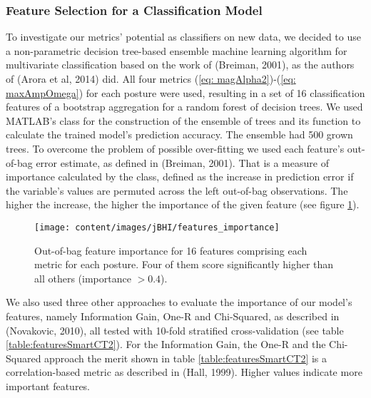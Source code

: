 \subsubsection{Feature Selection for a Classification Model}
\label{subsubsec:SmartCT2Features}
To investigate our metrics' potential as classifiers on new data, we decided to use a non-parametric decision tree-based ensemble machine learning algorithm for multivariate classification based on the work of (Breiman, 2001), as the authors of (Arora et al, 2014) did. All four metrics (\ref{eq: magAlpha2})-(\ref{eq: maxAmpOmega}) for each posture were used, resulting in a set of 16 classification features of a bootstrap aggregation for a random forest of decision trees. We used MATLAB’s  class for the construction of the ensemble of trees and its function  to calculate the trained model's prediction accuracy. The ensemble had 500 grown trees. To overcome the problem of possible over-fitting we used each feature's out-of-bag error estimate, as defined in (Breiman, 2001). That is a measure of importance calculated by the  class, defined as the increase in prediction error if the variable's values are permuted across the left out-of-bag observations. The higher the increase, the higher the importance of the given feature (see figure \ref{fig:featuresSmartCT2}). 


\begin{figure}[h]
	\centering
	\texttt{[image: content/images/jBHI/features\_importance]}
	\caption{Out-of-bag feature importance for 16 features comprising each metric for each posture. Four of them score significantly higher than all others (importance $> 0.4$).}
	\label{fig:featuresSmartCT2}
\end{figure}

We also used three other approaches to evaluate the importance of our model's features, namely Information Gain, One-R and Chi-Squared, as described in (Novakovic, 2010), all tested with 10-fold stratified cross-validation (see table \ref{table:featuresSmartCT2}). For the Information Gain, the One-R and the Chi-Squared approach the merit shown in table \ref{table:featuresSmartCT2} is a correlation-based metric as described in (Hall, 1999). Higher values indicate more important features. 

